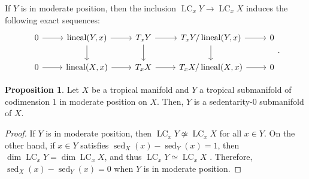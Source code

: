 \documentclass[a4paper,dvipdfmx,reqno,12pt]{amsart}
\theoremstyle{definition}
\newtheorem{proposition}[theorem]{Proposition}
\newcommand{\opn}[1]{\operatorname{#1}}
\numberwithin{equation}{section}
\begin{document}
If $Y$ is in moderate position, then
the inclusion 
$\opn{LC}_x Y\to \opn{LC}_x X$ induces the following 
exact sequences:
\[\begin{tikzcd}
	0 & {\opn{lineal}(Y,x)} & {T_x Y} & {T_x Y/\opn{lineal}(Y,x)} & 0 \\
	0 & {\opn{lineal}(X,x)} & {T_x X} & 
{T_x X/\opn{lineal}(X,x)} & 0
	\arrow[from=1-1, to=1-2]
	\arrow[from=2-1, to=2-2]
	\arrow[from=2-3, to=2-4]
	\arrow[from=1-3, to=1-4]
	\arrow[from=1-4, to=2-4]
	\arrow[from=1-2, to=2-2]
	\arrow[from=1-2, to=1-3]
	\arrow[from=2-2, to=2-3]
	\arrow[from=1-3, to=2-3]
	\arrow[from=2-4, to=2-5]
	\arrow[from=1-4, to=1-5]
\end{tikzcd}.\]

\begin{proposition}
Let $X$ be a tropical manifold and 
$Y$ a tropical submanifold of codimension $1$
in moderate position on $X$.
Then, $Y$ is a sedentarity-0 submanifold of $X$.
\end{proposition}
\begin{proof}
If $Y$ is in moderate position,
then $\opn{LC}_x Y\not \simeq \opn{LC}_x X$ for all 
$x \in Y$.
On the other hand, if $x \in Y$ satisfies 
$\opn{sed}_X(x)-\opn{sed}_Y(x)=1$, then
$\dim \opn{LC}_x Y=\dim \opn{LC}_x X$,
and thus $\opn{LC}_x Y\simeq \opn{LC}_x X$
\cite[Lemma 2.4]{MR3041763}.
Therefore, $\opn{sed}_X(x)-\opn{sed}_Y(x)=0$ when
$Y$ is in moderate position. 
\end{proof}
\end{document}
